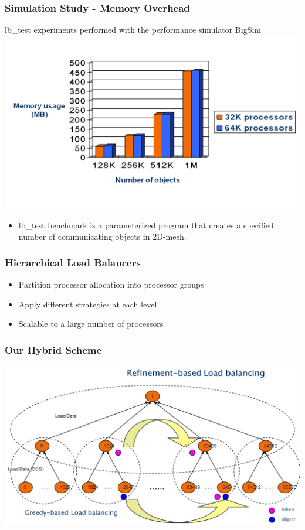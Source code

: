 \begin{frame}[fragile]
\frametitle{Simulation Study - Memory Overhead}
lb\_test experiments performed with the performance simulator BigSim
\includegraphics[width=1.0\textwidth]{figures/LBMemOverhead}
\begin{itemize}
 \item lb\_test benchmark is a parameterized program that creates a 
specified number of communicating objects in 2D-mesh.
\end{itemize}
\end{frame}


\begin{frame}[fragile]
\frametitle{Hierarchical Load Balancers}
\begin{itemize}
\item Partition processor allocation into processor groups
\item Apply different strategies at each level
\item Scalable to a large number of processors
\end{itemize}
\end{frame}

\begin{frame}[fragile]
\frametitle{Our Hybrid Scheme}
\includegraphics[width=1.0\textwidth]{figures/hybridLBScheme}
\end{frame}

